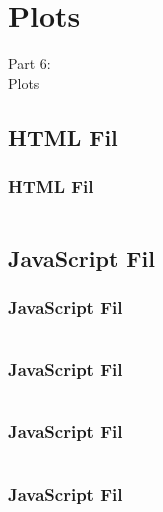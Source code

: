 \section{Plots}
\begin{frame}
    \vspace{25mm}
    \begin{center}
        \Huge{Part 6:\\Plots}
    \end{center}
\end{frame}

\subsection{HTML Fil}
\begin{frame}
    \frametitle{HTML Fil}
    \vspace{-1mm}
    \inputminted[fontsize=\footnotesize,breaklines=true,highlightlines={10,13}]{html}{../src/frontend/part6_plot/index.html}
\end{frame}

\subsection{JavaScript Fil}
\begin{frame}
    \frametitle{JavaScript Fil}
    \vspace{-2mm}
    \begin{multicols}{2}
      \inputminted[fontsize=\tiny,highlightlines={}]{javascript}{../src/frontend/part6_plot/logic.js}
    \end{multicols}
\end{frame}
\begin{frame}
    \frametitle{JavaScript Fil}
    \vspace{-2mm}
    \begin{multicols}{2}
      \inputminted[fontsize=\tiny,highlightlines={1-3,39-40,44-45}]{javascript}{../src/frontend/part6_plot/logic.js}
    \end{multicols}
\end{frame}
\begin{frame}
    \frametitle{JavaScript Fil}
    \vspace{-2mm}
    \begin{multicols}{2}
      \inputminted[fontsize=\tiny,highlightlines={42}]{javascript}{../src/frontend/part6_plot/logic.js}
    \end{multicols}
\end{frame}
\begin{frame}
    \frametitle{JavaScript Fil}
    \vspace{-2mm}
    \begin{multicols}{2}
      \inputminted[fontsize=\tiny,highlightlines={43-46}]{javascript}{../src/frontend/part6_plot/logic.js}
    \end{multicols}
\end{frame}

